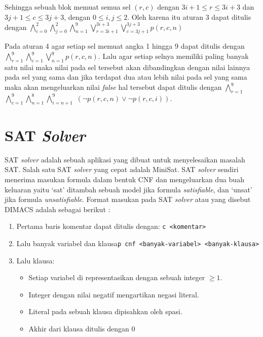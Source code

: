 Sehingga sebuah blok memuat semua sel $\left(r,c\right)$ dengan $3i+1\leq r\leq3i+3$
dan $3j+1\leq c\leq3j+3$, dengan $0\leq i,j\leq2$. Oleh karena itu aturan 3 dapat ditulis dengan $\bigwedge_{i=0}^{2}$$\bigwedge_{j=0}^{2}$$\bigwedge_{n=1}^{9}$$\bigvee_{r=3i+1}^{3i+3}$$\bigvee_{c=3j+1}^{3j+3}$$p\left(r,c,n\right)$

Pada aturan 4 agar setiap sel memuat angka 1 hingga 9 dapat ditulis dengan $\bigwedge_{r=1}^{9}$$\bigwedge_{c=1}^{9}$$\bigvee_{n=1}^{9}$$p\left(r,c,n\right)$. Lalu agar setiap selnya memiliki paling banyak satu nilai maka nilai pada sel tersebut akan dibandingkan dengan nilai lainnya pada sel yang sama dan jika terdapat dua atau lebih nilai pada sel yang sama maka akan mengeluarkan nilai \textit{false} hal tersebut  dapat ditulis dengan $\bigwedge_{r=1}^{9}$$\bigwedge_{c=1}^{9}$$\bigwedge_{n=1}^{8}$$\bigwedge_{i=n+1}^{9}$
$\left(\neg p\left(r,c,n\right)\vee\neg p\left(r,c,i\right)\right)$.

\section{SAT \textit{Solver}}

SAT \textit{solver} adalah sebuah aplikasi yang dibuat untuk menyelesaikan masalah SAT. Salah satu SAT \textit{solver} yang cepat adalah MiniSat. SAT \textit{solver} sendiri menerima masukan formula dalam bentuk CNF dan mengeluarkan dua buah keluaran yaitu `sat' ditambah sebuah model jika formula \textit{satisfiable}, dan `unsat' jika formula \textit{unsatisfiable}. Format masukan pada SAT \textit{solver} atau yang disebut DIMACS adalah sebagai berikut :

\begin{enumerate}
	\item Pertama baris komentar dapat ditulis dengan: \texttt{c <komentar>}
	\item Lalu banyak variabel dan klausa\texttt{p cnf <banyak-variabel> <banyak-klausa>}
	\item Lalu klausa: 
	
	\begin{itemize}
		\item Setiap variabel di representasikan dengan sebuah integer $\geq1$.
		\item Integer dengan nilai negatif mengartikan negasi literal.
		\item Literal pada sebuah klausa dipisahkan oleh spasi.
		\item Akhir dari klausa ditulis dengan 0
	\end{itemize}
\end{enumerate}

